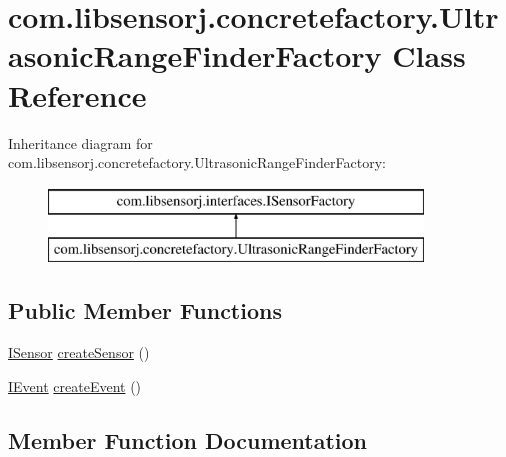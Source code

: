 \hypertarget{classcom_1_1libsensorj_1_1concretefactory_1_1UltrasonicRangeFinderFactory}{}\section{com.\+libsensorj.\+concretefactory.\+Ultrasonic\+Range\+Finder\+Factory Class Reference}
\label{classcom_1_1libsensorj_1_1concretefactory_1_1UltrasonicRangeFinderFactory}
Inheritance diagram for com.\+libsensorj.\+concretefactory.\+Ultrasonic\+Range\+Finder\+Factory\+:\begin{figure}[H]
\begin{center}
\leavevmode
\includegraphics[height=2.000000cm]{classcom_1_1libsensorj_1_1concretefactory_1_1UltrasonicRangeFinderFactory}
\end{center}
\end{figure}
\subsection*{Public Member Functions}
\begin{DoxyCompactItemize}
\item 
\hyperlink{interfacecom_1_1libsensorj_1_1interfaces_1_1ISensor}{I\+Sensor} \hyperlink{classcom_1_1libsensorj_1_1concretefactory_1_1UltrasonicRangeFinderFactory_a3aa6e46ef47bf97355df4d5cfb1b1e01}{create\+Sensor} ()
\item 
\hyperlink{interfacecom_1_1libsensorj_1_1interfaces_1_1IEvent}{I\+Event} \hyperlink{classcom_1_1libsensorj_1_1concretefactory_1_1UltrasonicRangeFinderFactory_a8a7d0c55346f1ab5630a878f6a3175fd}{create\+Event} ()
\end{DoxyCompactItemize}


\subsection{Member Function Documentation}
\hypertarget{classcom_1_1libsensorj_1_1concretefactory_1_1UltrasonicRangeFinderFactory_a8a7d0c55346f1ab5630a878f6a3175fd}{}
